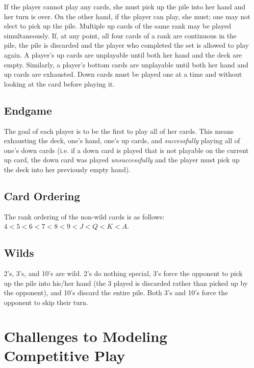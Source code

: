 \documentclass[paper=a4, fontsize=11pt]{scrartcl}
\numberwithin{equation}{section}		%
\numberwithin{figure}{section}			%
\numberwithin{table}{section}				%
\begin{document}
If the player cannot play any cards, she must pick up the pile into her hand and her turn is over. On the other hand, if the player can play, she must; one may not elect to pick up the pile. Multiple up cards of the same rank may be played simultaneously. If, at any point, all four cards of a rank are continuous in the pile, the pile is discarded and the player who completed the set is allowed to play again. A player's up cards are unplayable until both her hand and the deck are empty. Similarly, a player's bottom cards are unplayable until both her hand and up cards are exhausted. Down cards must be played one at a time and without looking at the card before playing it. 
	
\subsection{Endgame}
The goal of each player is to be the first to play all of her cards. This means exhausting the deck, one's hand, one's up cards, and \emph{successfully} playing all of one's down cards (i.e. if a down card is played that is not playable on the current up card, the down card was played \emph{unsuccessfully} and the player must pick up the deck into her previously empty hand). 
	
\subsection{Card Ordering}
The rank ordering of the non-wild cards is as follows: $4 < 5 < 6 < 7< 8 < 9 < J < Q < K < A$. 
	
\subsection{Wilds}
2's, 3's, and 10's are wild. 2's do nothing special, 3's force the opponent to pick up the pile into his/her hand (the 3 played is discarded rather than picked up by the opponent), and 10's discard the entire pile. Both 3's and 10's force the opponent to skip their turn. 


\section{Challenges to Modeling Competitive Play}
\end{document}
